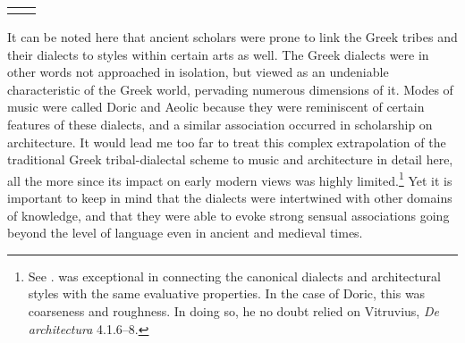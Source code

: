 \begin{longtable}{>{\raggedright\arraybackslash}p{3cm}>{\raggedright\arraybackslash}p{\textwidth - 3\tabcolsep - 3cm}}
{%
\end{longtable}

It can be noted here that ancient scholars were prone to link the Greek tribes and their dialects to styles within certain arts as well. The Greek dialects were in other words not approached in isolation, but viewed as an undeniable characteristic of the Greek world, pervading numerous dimensions of it. Modes of music were called Doric and Aeolic because they were reminiscent of certain features of these dialects, and a similar association occurred in scholarship on architecture. It would lead me too far to treat this complex extrapolation of the traditional Greek tribal-dialectal scheme to music and architecture in detail here, all the more since its impact on early modern views was highly limited.\footnote{See \citet{Cassio1984}. \citet[118]{Mazzocchi1754} was exceptional in connecting the canonical dialects and architectural styles with the same evaluative properties. In the case of Doric, this was coarseness and roughness. In doing so, he no doubt relied on Vitruvius, \textit{De architectura} 4.1.6–8.} Yet it is important to keep in mind that the dialects were intertwined with other domains of knowledge, and that they were able to evoke strong sensual associations going beyond the level of language even in ancient and medieval times.

